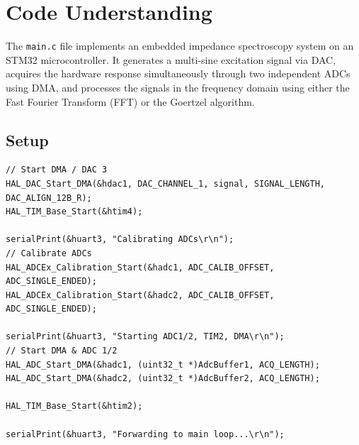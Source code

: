 \section{Code Understanding}
The \texttt{main.c} file implements an embedded impedance spectroscopy system on an STM32 microcontroller. It generates a multi-sine excitation signal via DAC, acquires the hardware response simultaneously through two independent ADCs using DMA, and processes the signals in the frequency domain using either the Fast Fourier Transform (FFT) or the Goertzel algorithm.

\subsection{Setup}
\begin{lstlisting}
// Start DMA / DAC 3
HAL_DAC_Start_DMA(&hdac1, DAC_CHANNEL_1, signal, SIGNAL_LENGTH, DAC_ALIGN_12B_R);
HAL_TIM_Base_Start(&htim4);

serialPrint(&huart3, "Calibrating ADCs\r\n");
// Calibrate ADCs
HAL_ADCEx_Calibration_Start(&hadc1, ADC_CALIB_OFFSET, ADC_SINGLE_ENDED);
HAL_ADCEx_Calibration_Start(&hadc2, ADC_CALIB_OFFSET, ADC_SINGLE_ENDED);

serialPrint(&huart3, "Starting ADC1/2, TIM2, DMA\r\n");
// Start DMA & ADC 1/2
HAL_ADC_Start_DMA(&hadc1, (uint32_t *)AdcBuffer1, ACQ_LENGTH);
HAL_ADC_Start_DMA(&hadc2, (uint32_t *)AdcBuffer2, ACQ_LENGTH);

HAL_TIM_Base_Start(&htim2);

serialPrint(&huart3, "Forwarding to main loop...\r\n");
\end{lstlisting}

